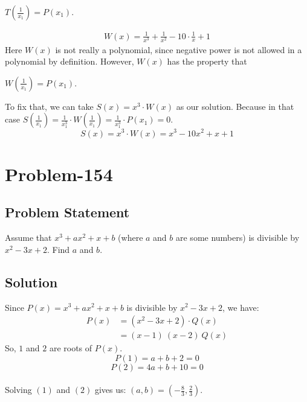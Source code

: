 \documentclass[12pt]{article}
\begin{document}
$T\left( \frac{1}{x_1} \right) = P(x_1)$.

\begin{equation*}
	\begin{aligned}
		W(x) = \frac{1}{x^3} + \frac{1}{x^2} - 10 \cdot \frac{1}{x} + 1
	\end{aligned}
\end{equation*}
Here $W(x)$ is not really a polynomial, since negative power is not allowed in a polynomial by definition. However, $W(x)$ has the property that 

$W\left( \frac{1}{x_1} \right) = P(x_1)$.

To fix that, we can take $S(x) = x^3 \cdot W(x)$ as our solution. Because in that case $S\left( \frac{1}{x_1} \right) = \frac{1}{x_1^3} \cdot W\left( \frac{1}{x_1} \right) = \frac{1}{x_1^3} \cdot P(x_1) = 0$.
\[
	S(x) = x^3 \cdot W(x) = x^3 - 10x^2 + x + 1
\]

\section*{Problem-154}
\subsection*{Problem Statement}
Assume that $x^3 + ax^2 + x + b$ (where $a$ and $b$ are some numbers) is divisible by $x^2-3x+2$. Find $a$ and $b$.

\subsection*{Solution}
Since $P(x) = x^3 + ax^2 + x + b$ is divisible by $x^2-3x+2$, we have:
\begin{equation*}
	\begin{aligned}
		P(x) &= \left( x^2-3x+2 \right) \cdot Q(x)\\
						   &= (x-1) \ (x-2) \ Q(x)
	\end{aligned}
\end{equation*}
So, $1$ and $2$ are roots of $P(x)$.
\begin{equation}
	P(1) = a+b+2 = 0
\end{equation}
\begin{equation}
	P(2) = 4a + b + 10 = 0
\end{equation}
\\
Solving $(1)$ and $(2)$ gives us: $(a, b) = \left( -\frac{8}{3}, \frac{2}{3} \right)$.
\end{document}
